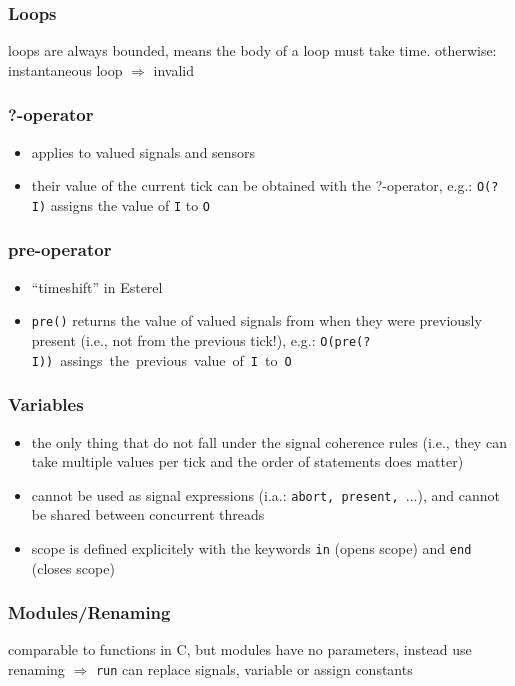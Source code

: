 \documentclass[german]{latex4ei/latex4ei_sheet}
\begin{document}
\begin{sectionbox}
\subsubsection{Loops}
loops are always bounded, means the body of a loop must take time. otherwise: instantaneous loop $\Rightarrow$ invalid

\subsubsection{?-operator}
\begin{itemize}
\item applies to valued signals and sensors
\item their value of the current tick can be obtained with the ?-operator, e.g.: \texttt{O(?I)} assigns the value of \texttt{I} to \texttt{O}
\end{itemize}

\subsubsection{pre-operator}
\begin{itemize}
\item "`timeshift"' in Esterel
\item \texttt{pre()} returns the value of valued signals from when they were previously present (i.e., not from the
previous tick!), e.g.: \mbox{\texttt{O(pre(?I))} assings the previous value of \texttt{I} to \texttt{O}}
\end{itemize}

\subsubsection{Variables}
\begin{itemize}
\item the only thing that do not fall under the signal coherence rules (i.e., they can take multiple values per tick and the order of statements does matter)
\item cannot be used as signal expressions (i.a.: \texttt{abort, present, $\ldots$}), and cannot be shared between concurrent threads
\item scope is defined explicitely with the keywords \texttt{in} (opens scope) and \texttt{end} (closes scope)
\end{itemize}

\subsubsection{Modules/Renaming}
comparable to functions in C, but modules have no parameters, instead use renaming $\Rightarrow$ \texttt{run} can replace signals, variable or assign constants
\end{sectionbox}
\end{document}

